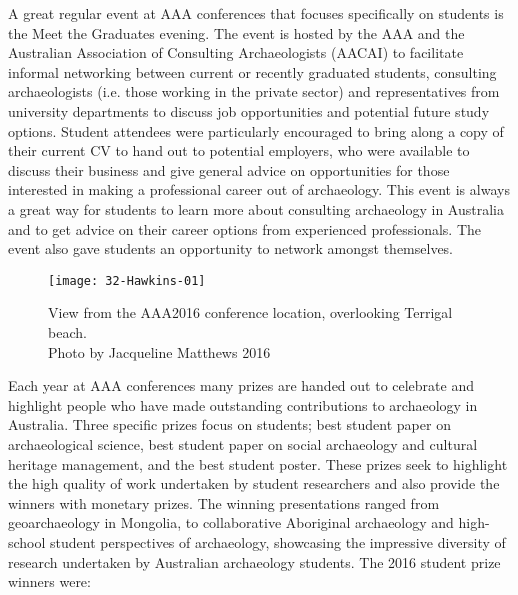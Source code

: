 A great regular event at AAA conferences that focuses specifically on students is the Meet the Graduates evening. The event is hosted by the AAA and the Australian Association of Consulting Archaeologists (AACAI) to facilitate informal networking between current or recently graduated students, consulting archaeologists (i.e. those working in the private sector) and representatives from university departments to discuss job opportunities and potential future study options. Student attendees were particularly encouraged to bring along a copy of their current CV to hand out to potential employers, who were available to discuss their business and give general advice on opportunities for those interested in making a professional career out of archaeology. This event is always a great way for students to learn more about consulting archaeology in Australia and to get advice on their career options from experienced professionals. The event also gave students an opportunity to network amongst themselves. 


\begin{figure}[!htb]
	\texttt{[image: 32-Hawkins-01]}
	\caption{View from the AAA2016 conference location, overlooking Terrigal beach.
		{\normalfont\scriptsize \\ Photo by Jacqueline Matthews 2016
	}}
	\label{fig:32-Hawkins-01}
\end{figure}


Each year at AAA conferences many prizes are handed out to celebrate and highlight people who have made outstanding contributions to archaeology in Australia. Three specific prizes focus on students; best student paper on archaeological science, best student paper on social archaeology and cultural heritage management, and the best student poster. These prizes seek to highlight the high quality of work undertaken by student researchers and also provide the winners with monetary prizes. The winning presentations ranged from geoarchaeology in Mongolia, to collaborative Aboriginal archaeology and high-school student perspectives of archaeology, showcasing the impressive diversity of research undertaken by Australian archaeology students. The 2016 student prize winners were:
 
